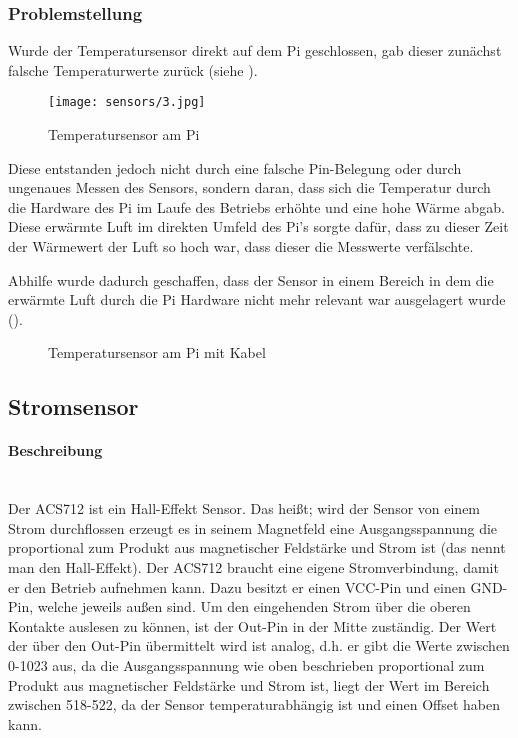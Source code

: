 \subsubsection{Problemstellung}
Wurde der Temperatursensor direkt auf dem Pi geschlossen, gab dieser zunächst falsche Temperaturwerte zurück (siehe ).

\begin{figure}[H]
\centering
\texttt{[image: sensors/3.jpg]}
\caption{Temperatursensor am Pi}
\label{fig:sensors3}
\end{figure}

Diese entstanden jedoch nicht durch eine falsche Pin-Belegung oder durch ungenaues Messen des Sensors, sondern daran, dass sich die Temperatur durch die Hardware des Pi im Laufe des Betriebs erhöhte und eine hohe Wärme abgab. Diese erwärmte Luft im direkten Umfeld des Pi’s sorgte dafür, dass zu dieser Zeit der Wärmewert der Luft so hoch war, dass dieser die Messwerte verfälschte.

Abhilfe wurde dadurch geschaffen, dass der Sensor in einem Bereich in dem die erwärmte Luft durch die Pi Hardware nicht mehr relevant war ausgelagert wurde ().

\begin{figure}[H]
\centering
{}
\caption{Temperatursensor am Pi mit Kabel}
\label{fig:sensors4}
\end{figure}

\subsection{Stromsensor}
\paragraph{Beschreibung}\mbox{}\\
Der ACS712 ist ein Hall-Effekt Sensor. Das heißt; wird der Sensor von einem Strom durchflossen erzeugt es in seinem Magnetfeld eine Ausgangsspannung die proportional zum Produkt aus magnetischer Feldstärke und Strom ist (das nennt man den Hall-Effekt). Der ACS712 braucht eine eigene Stromverbindung, damit er den Betrieb aufnehmen kann. Dazu besitzt er einen VCC-Pin und einen GND-Pin, welche jeweils außen sind. Um den eingehenden Strom über die oberen Kontakte auslesen zu können, ist der Out-Pin in der Mitte zuständig. Der Wert der über den Out-Pin übermittelt wird ist analog, d.h. er gibt die Werte zwischen 0-1023 aus, da die Ausgangsspannung wie oben beschrieben proportional zum Produkt aus magnetischer Feldstärke und Strom ist, liegt der Wert im Bereich zwischen 518-522, da der Sensor temperaturabhängig ist und einen Offset haben kann.


